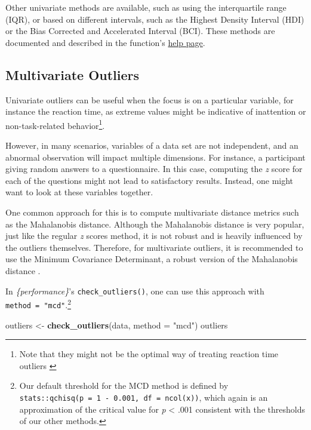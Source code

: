 \documentclass[sn-basic, lineno,pdflatex]{sn-jnl}
\newenvironment{Shaded}{\begin{snugshade}}{\end{snugshade}}
\newcommand{\AttributeTok}[1]{\textcolor[rgb]{0.13,0.29,0.53}{#1}}
\newcommand{\FunctionTok}[1]{\textcolor[rgb]{0.13,0.29,0.53}{\textbf{#1}}}
\newcommand{\NormalTok}[1]{#1}
\newcommand{\OtherTok}[1]{\textcolor[rgb]{0.56,0.35,0.01}{#1}}
\newcommand{\StringTok}[1]{\textcolor[rgb]{0.31,0.60,0.02}{#1}}
\begin{document}
Other univariate methods are available, such as using the interquartile
range (IQR), or based on different intervals, such as the Highest
Density Interval (HDI) or the Bias Corrected and Accelerated Interval
(BCI). These methods are documented and described in the function's
\href{https://easystats.github.io/performance/reference/check_outliers.html}{help
page}.

\subsection{Multivariate Outliers}\label{multivariate-outliers}

Univariate outliers can be useful when the focus is on a particular
variable, for instance the reaction time, as extreme values might be
indicative of inattention or non-task-related behavior\footnote{ Note
  that they might not be the optimal way of treating reaction time
  outliers \citep{ratcliff1993methods, van1995statistical}}.

However, in many scenarios, variables of a data set are not independent,
and an abnormal observation will impact multiple dimensions. For
instance, a participant giving random answers to a questionnaire. In
this case, computing the \emph{z} score for each of the questions might
not lead to satisfactory results. Instead, one might want to look at
these variables together.

One common approach for this is to compute multivariate distance metrics
such as the Mahalanobis distance. Although the Mahalanobis distance is
very popular, just like the regular \emph{z} scores method, it is not
robust and is heavily influenced by the outliers themselves. Therefore,
for multivariate outliers, it is recommended to use the Minimum
Covariance Determinant, a robust version of the Mahalanobis distance
\citep[MCD,][]{leys2018outliers, leys2019outliers}.

In \emph{\{performance\}}'s \texttt{check\_outliers()}, one can use this
approach with \texttt{method\ =\ "mcd"}.\footnote{Our default threshold
  for the MCD method is defined by
  \texttt{stats::qchisq(p\ =\ 1\ -\ 0.001,\ df\ =\ ncol(x))}, which
  again is an approximation of the critical value for \emph{p}
  \textless{} .001 consistent with the thresholds of our other methods.}

\begin{Shaded}
\begin{Highlighting}[]
\NormalTok{outliers }\OtherTok{\textless{}{-}} \FunctionTok{check\_outliers}\NormalTok{(data, }\AttributeTok{method =} \StringTok{"mcd"}\NormalTok{)}
\NormalTok{outliers}
\end{Highlighting}
\end{Shaded}
\end{document}
